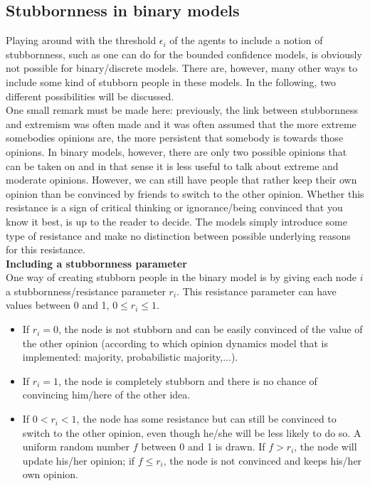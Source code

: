 \documentclass[11 pt , letterpaper , twoside , openright]{book}
\begin{document}
\subsection{Stubbornness in binary models}
\label{stubbBin}

Playing around with the threshold $\epsilon_i$ of the agents to include a notion of stubbornness, such as one can do for the bounded confidence models, is obviously not possible for binary/discrete models. There are, however, many other ways to include some kind of stubborn people in these models. In the following, two different possibilities will be discussed. \\
One small remark must be made here: previously, the link between stubbornness and extremism was often made and it was often assumed that the more extreme somebodies opinions are, the more persistent that somebody is towards those opinions. In binary models, however, there are only two possible opinions that can be taken on and in that sense it is less useful to talk about extreme and moderate opinions. However, we can still have people that rather keep their own opinion than be convinced by friends to switch to the other opinion. Whether this resistance is a sign of critical thinking or ignorance/being convinced that you know it best, is up to the reader to decide. The models simply introduce some type of resistance and make no distinction between possible underlying reasons for this resistance.\\
\newline
\textbf{Including a stubbornness parameter}\\
\newline
One way of creating stubborn people in the binary model is by giving each node $i$ a stubbornness/resistance parameter $r_i$. This resistance parameter can have values between 0 and 1, $0 \leqslant r_i \leqslant 1$. 
\begin{itemize}
	\item If $r_i = 0$, the node is not stubborn and can be easily convinced of the value of the other opinion (according to which opinion dynamics model that is implemented: majority, probabilistic majority,...).
	\item If $r_i = 1$, the node is completely stubborn and there is no chance of convincing him/here of the other idea.
	\item If $0 < r_i < 1$, the node has some resistance but can still be convinced to switch to the other opinion, even though he/she will be less likely to do so. A uniform random number $f$ between 0 and 1 is drawn. If $f > r_i$, the node will update his/her opinion; if $f \leqslant r_i$, the node is not convinced and keeps his/her own opinion.
\end{itemize}
\end{document}
